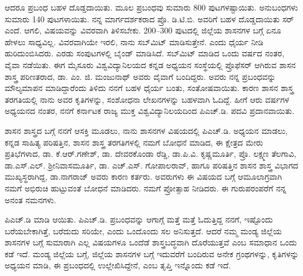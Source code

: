 ಆದರೂ ಪ್ರಬಂಧ ಬಹಳ ದೊಡ್ಡದಾಯಿತು. ಮೂಲ ಪ್ರಬಂಧವು ಸುಮಾರು 800 ಪುಟಗಳಷ್ಟಾಯಿತು. ಅನುಬಂಧಗಳು ಸುಮಾರು 140 ಪುಟಗಳಾಯಿತು. ನನ್ನ ಮಾರ್ಗದರ್ಶಕರಾದ ಪ್ರೊ. ಡಿ.ಟಿ.ಬಿ. ಅವರಿಗೆ ಬಹಳ ದೊಡ್ಡದಾಯಿತು ಸರ್​ ಎಂದೆ. ಆಗಲಿ, ವಿಷಯವನ್ನು ವಿವರವಾಗಿ ತಿಳಿಸಬೇಕು. 200–300 ಪುಟದಲ್ಲಿ ಜಿಲ್ಲೆಯ ಶಾಸನಗಳ ಬಗ್ಗೆ ಏನೂ ಹೇಳಲು ಸಾಧ್ಯವಿಲ್ಲ. ವಿವರವಾಗಿಯೇ ಇರಲಿ, ನಾನು ಸಬ್​ಮಿಟ್​ ಮಾಡಿಸುತ್ತೇನೆ. ಎಂದು ಧೈರ್ಯ ನೀಡಿ ಹುರಿದುಂಬಿಸಿದರು. ಎರಡು ಸಂಪುಟಗಳಲ್ಲಿ ಬೈಂಡ್​ ಮಾಡಿಸಿದೆ. ಸಬ್​ಮಿಟ್​ ಮಾಡಿದ ಒಂದು ವರ್ಷದ ನಂತರ, ವೈವಾ ನಡೆಯಿತು. ಈಗ ಮೈಸೂರು ವಿಶ್ವವಿದ್ಯಾನಿಲಯದ ಕನ್ನಡ ಅಧ್ಯಯನ ಸಂಸ್ಥೆಯಲ್ಲಿ ಪ್ರೊಫೆಸರ್​ ಆಗಿರುವ ಶಾಸನ ಶಾಸ್ತ್ರ ಪರಿಣತರಾದ, ಡಾ. ಎಂ. ಜಿ. ಮಂಜುನಾಥ್​ ಅವರು ವೈವಾಗೆ ಬಂದಿದ್ದರು. ಅವರು ನನ್ನ ಪ್ರಬಂಧವನ್ನು ಮೌಲ್ಯಮಾಪನ ಮಾಡಿದ್ದಾರೆಂದು ತಿಳಿದು ನನಗೆ ಬಹಳ ಧೈರ್ಯ ಬಂತು, ಸಂತೋಷವಾಯಿತು. ಕಾರಣ ಶಾಸನ ಶಾಸ್ತ್ರ ತರಗತಿಯಲ್ಲಿ ನಾನು ಅವರ ಕೃತಿಗಳನ್ನು, ಸಂಶೋಧನಾ ಲೇಖನಗಳನ್ನು ಬಹಳವಾಗಿ ಓದಿದ್ದೆ. ಹೀಗೆ ಆರು ವರ್ಷಗಳ ಅಧ್ಯಯನದ ನಂತರ, ನನಗೆ ಕರ್ನಾಟಕ ರಾಜ್ಯ ಮುಕ್ತ ವಿಶ್ವವಿದ್ಯಾನಿಲಯದಿಂದ ಪಿಎಚ್​.ಡಿ. ಪದವಿ ಪ್ರದಾನವಾಯಿತು. 

ಶಾಸನ ಶಾಸ್ತ್ರದ ಬಗ್ಗೆ ನನಗೆ ಆಸಕ್ತಿ ಮೂಡಲು, ನಾನು ಶಾಸನಗಳ ವಿಷಯದಲ್ಲಿ ಪಿಎಚ್​.ಡಿ. ಅಧ್ಯಯನ ಮಾಡಲು, ಕನ್ನಡ ಸಾಹಿತ್ಯ ಪರಿಷತ್ತಿನ, ಶಾಸನ ಶಾಸ್ತ್ರ ತರಗತಿಗಳಲ್ಲಿ ನಮಗೆ ಬೋಧನೆ ಮಾಡಿದ, ಈ ಕ್ಷೇತ್ರದ ಮೇರು ಪ್ರತಿಭೆಗಳಾದ, ಡಾ. ಕೆ.ಆರ್​.ಗಣೇಶ್​, ಡಾ. ದೇವರಕೊಂಡಾ ರೆಡ್ಡಿ, ಡಾ.ಪಿ.ವಿ. ಕೃಷ್ಣಮೂರ್ತಿ, ಪ್ರೊ. ಲಕ್ಷ್ಮಣ ತೆಲಗಾವಿ, ಡಾ.ಎಸ್​.ಎಲ್​. ಶ‍್ರೀನಿವಾಸಮೂರ್ತಿ, ಡಾ. ಎಚ್​.ಎಸ್​. ಗೋಪಾಲರಾವ್​, ಹಾಗೂ ಪರಿಷತ್ತಿನ ಶಾಸನ ಶಾಸ್ತ್ರ ವಿಭಾಗದ ಮುಖ್ಯಸ್ಥರಾಗಿದ್ದ, ಡಾ.ನಾಗರಾಜ್​ ಅವರು ಕಾರಣ ಕರ್ತರು. ಅವರುಗಳು ಈ ವಿಷಯದ ಬಗ್ಗೆ ಆಮೂಲಾಗ್ರವಾಗಿ ನಮಗೆ ಅಭಿರುಚಿ ಹುಟ್ಟುವಂತೆ ಬೋಧನೆ ಮಾಡಿದರು. ನಮಗೆ ಪ್ರೋತ್ಸಾಹ ನೀಡಿದರು. ಈ ಗುರುಪರಂಪರೆಗೆ ನನ್ನ ಅನಂತ ನಮನಗಳು. 

\newpage

ಪಿಎಚ್​.ಡಿ ಮಾಡಿ ಆಯಿತು. ಪಿಎಚ್​.ಡಿ. ಪ್ರಬಂಧವನ್ನು ಆಗಾಗ್ಗೆ ಮತ್ತೆ ಮತ್ತೆ ಓದುತ್ತಿದ್ದ ನನಗೆ, ಇಷ್ಟೊಂದು ಬರೆಯಬೇಕಾಗಿತ್ತೆ, ಬರೆದುದು ಸರಿಯೇ, ಎಂದು ಒಂದೊಂದು ಸಲ ಅನಿಸುತ್ತದೆ. ಆದರೆ ನಮ್ಮ ಮಂಡ್ಯ ಜಿಲ್ಲೆಯ ಶಾಸನಗಳ ಬಗ್ಗೆ ಸುಮಾರಾಗಿ ಎಲ್ಲ ವಿಷಯಗಳೂ ಒಂದೆಡೆ ಶಾಸ್ತ್ರಬದ್ಧವಾಗಿ ದೊರೆಯುತ್ತವೆ ಎಂಬ ಸಮಾಧಾನ ಒಂದು ಕಡೆ ಇದೆ. ಮಂಡ್ಯ ಜಿಲ್ಲೆಯ ಬಗ್ಗೆ, ಜಿಲ್ಲೆಯ ಶಾಸನಗಳ ಬಗ್ಗೆ ಇದುವರೆಗೆ ಬಂದಿರುವ ಅನೇಕ ಗ್ರಂಥಗಳನ್ನು, ಕೃತಿಗಳನ್ನು ಅಧ್ಯಯನ ಮಾಡಿ, ಈ ಪ್ರಬಂಧದಲ್ಲಿ ಉಲ್ಲೇಖಿಸಿದ್ದೇನೆ, ಎಂಬ ತೃಪ್ತಿ ಇನ್ನೊಂದು ಕಡೆ ಇದೆ. 

